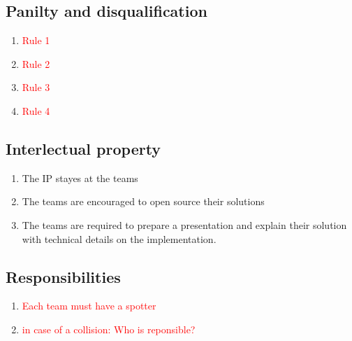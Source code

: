 \subsection{Panilty and disqualification}
\begin{enumerate}
	\item{\textcolor{red}{Rule 1}}
	\item{\textcolor{red}{Rule 2}}
	\item{\textcolor{red}{Rule 3}}
	\item{\textcolor{red}{Rule 4}}
\end{enumerate}

\subsection{Interlectual property}
\begin{enumerate}
	\item{The IP stayes at the teams}
	\item{The teams are encouraged to open source their solutions}
	\item{The teams are required to prepare a presentation and explain their solution with technical details on the implementation.}
\end{enumerate}

\subsection{Responsibilities}
\begin{enumerate}
	\item{\textcolor{red}{Each team must have a spotter}}
	\item{\textcolor{red}{in case of a collision: Who is reponsible? }}

\end{enumerate}
